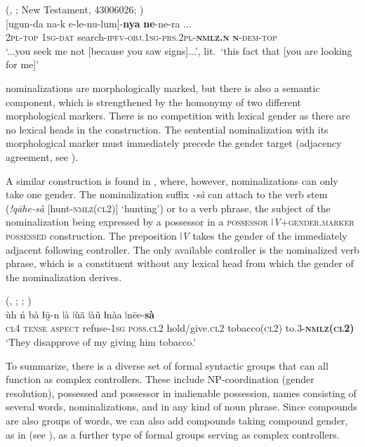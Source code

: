 \documentclass[output=collectionpaper]{langsci/langscibook}
\begin{document}
\ea\label{ex:WDG:58}
 (, ; New Testament, 43006026; \citealt[80]{Waelchli2018})\\
 [ugun-da	na-k	e-le-nu-lum]-\textbf{nya}	\textbf{ne}-ne-ra {...}\\
{} \textsc{2pl-top}	\textsc{1sg-dat}	search-\textsc{ipfv-obj.1sg-prs.2pl-\textbf{nmlz.n}}	\textsc{\textbf{n}-dem-top} {}\\
\glt `...you seek me not [because you saw signs]...', lit.\ `this fact that [you are looking for me]' \\
\z

 nominalizations are morphologically marked, but there is also a semantic component, which is strengthened by the homonymy of two different morphological markers. There is no competition with lexical gender as there are no lexical heads in the construction. The sentential nominalization with its morphological marker must immediately precede the gender target (adjacency agreement, see ).

A similar construction is found in , where, however, nominalizations can only take one gender. The nominalization suffix \textit{-sà} can attach to the verb stem (\textit{!qāhe-sà} [hunt-\textsc{nmlz(cl2)}] `hunting') or to a verb phrase, the subject of the nominalization being expressed by a possessor in a \textsc{possessor }\textit{ǀV}+\textsc{gender.marker possessed} construction. The preposition \textit{ǀV} takes the gender of the immediately adjacent following controller. The only available controller is the nominalized verb phrase, which is a constituent without any lexical head from which the gender of the nominalization derives.

\ea\label{ex:WDG:59}
 (, ; \citealt[30]{Traill1994}; \citealt[7]{Gueldemann2004})\\
\gll ùh	ń	bà	ǁṵ̄-n	ǀà	ǀùã	{ǀàũ ǁnàa}	ǀnēe-\textbf{sà}\\
\textsc{cl4}	\textsc{tense}	\textsc{aspect}	refuse-\textsc{1sg}	\textsc{poss.cl2}	hold/give.\textsc{cl2}	tobacco(\textsc{cl2})	to.3-\textbf{\textsc{nmlz(cl2)}}\\
\glt `They disapprove of my giving him tobacco.'\\
\z

To summarize, there is a diverse set of formal syntactic groups that can all function as complex controllers. These include NP-coordination (gender resolution), possessed and possessor in inalienable possession, names consisting of several words, nominalizations, and \textendash{} in  \textendash{} any kind of noun phrase. Since compounds are also groups of words, we can also add compounds taking compound gender, as in  (see ), as a further type of formal groups serving as complex controllers.
\end{document}
